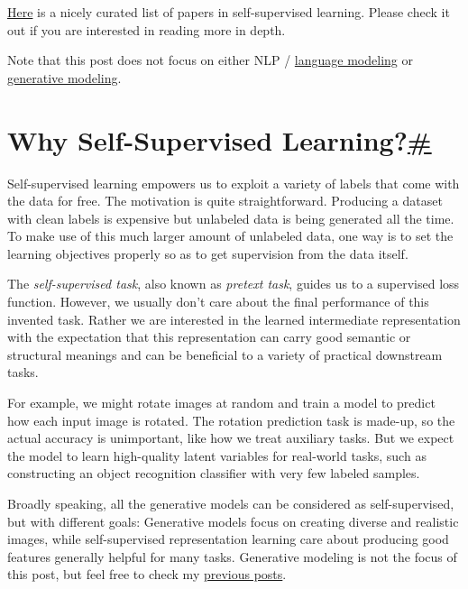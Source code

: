 \href{https://github.com/jason718/awesome-self-supervised-learning}{Here} is a nicely curated list of papers in self-supervised learning. Please check it out if you are interested in reading more in depth.

Note that this post does not focus on either NLP / \href{https://lilianweng.github.io/posts/2019-01-31-lm/}{language modeling} or \href{https://lilianweng.github.io/tags/generative-model/}{generative modeling}.

\section{\texorpdfstring{Why Self-Supervised Learning?\hyperref[why-self-supervised-learning]{\#}}{Why Self-Supervised Learning?\#}}\label{why-self-supervised-learning}

Self-supervised learning empowers us to exploit a variety of labels that come with the data for free. The motivation is quite straightforward. Producing a dataset with clean labels is expensive but unlabeled data is being generated all the time. To make use of this much larger amount of unlabeled data, one way is to set the learning objectives properly so as to get supervision from the data itself.

The \emph{self-supervised task}, also known as \emph{pretext task}, guides us to a supervised loss function. However, we usually don't care about the final performance of this invented task. Rather we are interested in the learned intermediate representation with the expectation that this representation can carry good semantic or structural meanings and can be beneficial to a variety of practical downstream tasks.

For example, we might rotate images at random and train a model to predict how each input image is rotated. The rotation prediction task is made-up, so the actual accuracy is unimportant, like how we treat auxiliary tasks. But we expect the model to learn high-quality latent variables for real-world tasks, such as constructing an object recognition classifier with very few labeled samples.

Broadly speaking, all the generative models can be considered as self-supervised, but with different goals: Generative models focus on creating diverse and realistic images, while self-supervised representation learning care about producing good features generally helpful for many tasks. Generative modeling is not the focus of this post, but feel free to check my \href{https://lilianweng.github.io/tags/generative-model/}{previous posts}.

